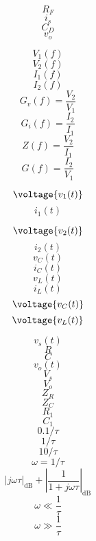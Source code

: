 \documentclass[letterpaper 12pt]{book}
\begin{document}
\[ R_F \]
\[ i_s \]
\[ C_{D} \]
\[ v_o \]

\[ V_1(f) \]
\[ V_2(f) \]
\[ I_1(f) \]
\[ I_2(f) \]
\[ G_v(f) = \frac{ V_2 }{V_1} \]
\[ G_i(f) = \frac{I_2}{I_1} \]
\[ Z(f) = \frac{ V_2 }{I_1} \]
\[ G(f) = \frac{I_2}{V_1} \]

\[ \voltage{v_1(t)} \]
\[ i_1(t) \]

\[ \voltage{v_2(t)} \]
\[ i_2(t) \]
\[ v_C(t) \]
\[ i_C(t) \]
\[ v_L(t) \]
\[ i_L(t) \]
\[ \voltage{v_C(t)} \]
\[ \voltage{v_L(t)} \]

\[ v_s(t) \]
\[ R \]
\[ C \]
\[ v_o(t) \]
\[ V_s \]
\[ V_o \]
\[ Z_R \]
\[ Z_C \]
\[ R_1 \]
\[ C_1 \]
\[ 0.1/\tau \]
\[ 1/\tau \]
\[ 10/\tau \]
\[ \omega = 1/\tau \]
\[ | j \omega \tau |_{\text{dB}} + \left| \frac{1}{1+j\omega \tau} \right|_{\text{dB}} \]
\[ \omega \ll \frac{1}{\tau} \]
\[ \omega \gg \frac{1}{\tau} \]
\end{document}
